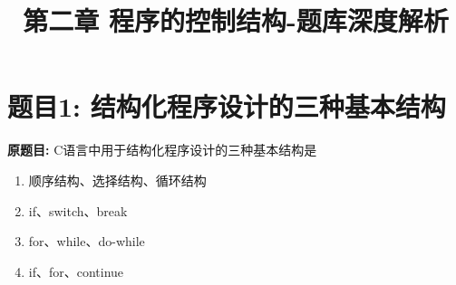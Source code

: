 \documentclass[a4paper,12pt]{article}
\title{\textbf{第二章 程序的控制结构-题库深度解析}}
\author{}
\date{}
\begin{document}
\maketitle

\tableofcontents
\newpage

\section*{题目1: 结构化程序设计的三种基本结构}

\textbf{原题目:}
C语言中用于结构化程序设计的三种基本结构是
\begin{enumerate}
	\item[A)] 顺序结构、选择结构、循环结构
	\item[B)] if、switch、break
	\item[C)] for、while、do-while
	\item[D)] if、for、continue
\end{enumerate}
\end{document}
